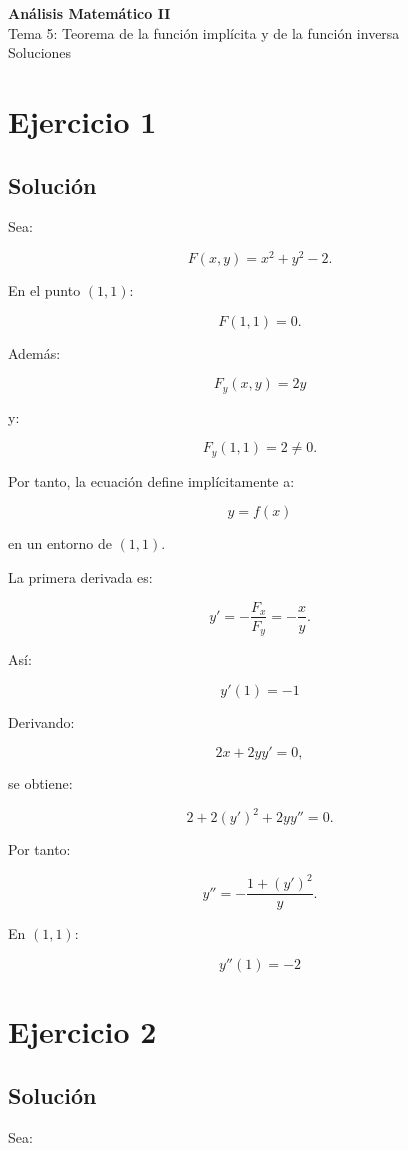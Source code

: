 \documentclass[11pt,a4paper]{article}
\begin{document}
\begin{center}
{\LARGE\bfseries Análisis Matemático II}\\[0.4em]
{\Large Tema 5: Teorema de la función implícita y de la función inversa}\\[0.4em]
{\large Soluciones}
\end{center}

\section{Ejercicio 1}
\subsection{Solución}

Sea:

\[
F(x,y)=x^2+y^2-2.
\]

En el punto \((1,1)\):

\[
F(1,1)=0.
\]

Además:

\[
F_y(x,y)=2y
\]

y:

\[
F_y(1,1)=2\neq0.
\]

Por tanto, la ecuación define implícitamente a:

\[
y=f(x)
\]

en un entorno de \((1,1)\).

La primera derivada es:

\[
y'
=
-\frac{F_x}{F_y}
=
-\frac{x}{y}.
\]

Así:

\[
\boxed{
y'(1)=-1
}
\]

Derivando:

\[
2x+2yy'=0,
\]

se obtiene:

\[
2+2(y')^2+2yy''=0.
\]

Por tanto:

\[
y''
=
-\frac{1+(y')^2}{y}.
\]

En \((1,1)\):

\[
\boxed{
y''(1)=-2
}
\]

\section{Ejercicio 2}
\subsection{Solución}

Sea:
\end{document}
